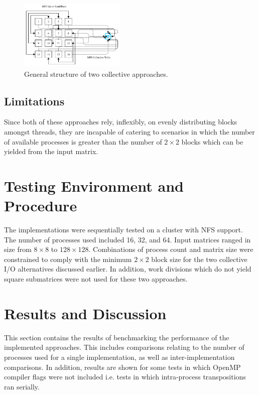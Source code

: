 \documentclass[journal,10pt,a4paper]{IEEEtran}
\begin{document}
\begin{figure}[H]
    \centering
    \includegraphics[width=0.45\textwidth]{col.pdf}
    \caption{General structure of two collective approaches.}
    \label{fig:my_label}
\end{figure}



\subsection{Limitations}
Since both of these approaches rely, inflexibly, on evenly distributing blocks amongst threads, they are incapable of catering to scenarios in which the number of available processes is greater than the number of $2\times 2$ blocks which can be yielded from the input matrix.








\section{Testing Environment and Procedure}

The implementations were sequentially tested on a cluster with NFS support. The number of processes used included 16, 32, and 64. Input matrices ranged in size from $8\times 8$ to $128\times 128$. Combinations of process count and matrix size were constrained to comply with the minimum $2\times 2$ block size for the two collective I/O alternatives discussed earlier. In addition, work divisions which do not yield square submatrices were not used for these two approaches.


\section{Results and Discussion}

This section contains the results of benchmarking the performance of the implemented approaches. This includes comparisons relating to the number of processes used for a single implementation, as well as inter-implementation comparisons. In addition, results are shown for some tests in which OpenMP compiler flags were not included i.e. tests in which intra-process transpositions ran serially.
\end{document}
